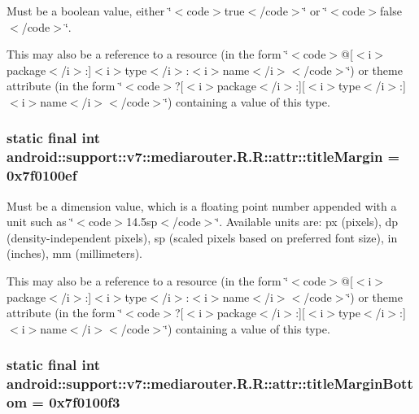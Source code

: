 Must be a boolean value, either \char`\"{}$<$code$>$true$<$/code$>$\char`\"{} or \char`\"{}$<$code$>$false$<$/code$>$\char`\"{}. 

This may also be a reference to a resource (in the form \char`\"{}$<$code$>$@\mbox{[}$<$i$>$package$<$/i$>$:\mbox{]}$<$i$>$type$<$/i$>$:$<$i$>$name$<$/i$>$$<$/code$>$\char`\"{}) or theme attribute (in the form \char`\"{}$<$code$>$?\mbox{[}$<$i$>$package$<$/i$>$:\mbox{]}\mbox{[}$<$i$>$type$<$/i$>$:\mbox{]}$<$i$>$name$<$/i$>$$<$/code$>$\char`\"{}) containing a value of this type. \hypertarget{classandroid_1_1support_1_1v7_1_1mediarouter_1_1_r_1_1attr_e4e8d6b01d2425ff1ad9bf16ba9ff27a}{
\subsubsection[{titleMargin}]{\setlength{\rightskip}{0pt plus 5cm}static final int android::support::v7::mediarouter.R.R::attr::titleMargin = 0x7f0100ef}}
\label{classandroid_1_1support_1_1v7_1_1mediarouter_1_1_r_1_1attr_e4e8d6b01d2425ff1ad9bf16ba9ff27a}


Must be a dimension value, which is a floating point number appended with a unit such as \char`\"{}$<$code$>$14.5sp$<$/code$>$\char`\"{}. Available units are: px (pixels), dp (density-independent pixels), sp (scaled pixels based on preferred font size), in (inches), mm (millimeters). 

This may also be a reference to a resource (in the form \char`\"{}$<$code$>$@\mbox{[}$<$i$>$package$<$/i$>$:\mbox{]}$<$i$>$type$<$/i$>$:$<$i$>$name$<$/i$>$$<$/code$>$\char`\"{}) or theme attribute (in the form \char`\"{}$<$code$>$?\mbox{[}$<$i$>$package$<$/i$>$:\mbox{]}\mbox{[}$<$i$>$type$<$/i$>$:\mbox{]}$<$i$>$name$<$/i$>$$<$/code$>$\char`\"{}) containing a value of this type. \hypertarget{classandroid_1_1support_1_1v7_1_1mediarouter_1_1_r_1_1attr_5d135919c7ebb9d5f09d14e107ca33f5}{
\subsubsection[{titleMarginBottom}]{\setlength{\rightskip}{0pt plus 5cm}static final int android::support::v7::mediarouter.R.R::attr::titleMarginBottom = 0x7f0100f3}}
\label{classandroid_1_1support_1_1v7_1_1mediarouter_1_1_r_1_1attr_5d135919c7ebb9d5f09d14e107ca33f5}


